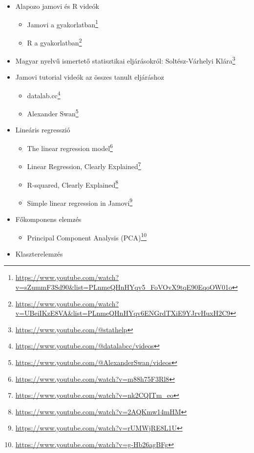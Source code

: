 \documentclass[
  letterpaper,
]{krantz}
\providecommand{\tightlist}{%
  \setlength{\itemsep}{0pt}\setlength{\parskip}{0pt}}\usepackage{longtable,booktabs,array}
\renewcommand{\href}[2]{#2\footnote{\url{#1}}}
\begin{document}
\begin{itemize}
\item
  Alapozo jamovi és R videók

  \begin{itemize}
  \tightlist
  \item
    \href{https://www.youtube.com/watch?v=sZummF3Sd90\&list=PLnmeQHnHYqv5_FoVOvX9tqE90EqoOW01o}{Jamovi
    a gyakorlatban}
  \item
    \href{https://www.youtube.com/watch?v=UBeiIKzE8VA\&list=PLnmeQHnHYqv6ENGrdTXiE9YJrvHuxH2C9}{R
    a gyakorlatban}
  \end{itemize}
\item
  Magyar nyelvű ismertető statisztikai eljárásokról:
  \href{https://www.youtube.com/@stathelp}{Soltész-Várhelyi Klára}
\item
  Jamovi tutorial videók az összes tanult eljáráshoz

  \begin{itemize}
  \tightlist
  \item
    \href{https://www.youtube.com/@datalabcc/videos}{datalab.cc}
  \item
    \href{https://www.youtube.com/@AlexanderSwan/videos}{Alexander Swan}
  \end{itemize}
\item
  Lineáris regresszió

  \begin{itemize}
  \tightlist
  \item
    \href{https://www.youtube.com/watch?v=m88h75F3Rl8}{The linear
    regression model}
  \item
    \href{https://www.youtube.com/watch?v=nk2CQITm_eo}{Linear
    Regression, Clearly Explained}
  \item
    \href{https://www.youtube.com/watch?v=2AQKmw14mHM}{R-squared,
    Clearly Explained}
  \item
    \href{https://www.youtube.com/watch?v=rUMWjRE8L1U}{Simple linear
    regression in Jamovi}
  \end{itemize}
\item
  Főkomponens elemzés

  \begin{itemize}
  \tightlist
  \item
    \href{https://www.youtube.com/watch?v=g-Hb26agBFg}{Principal
    Component Analysis (PCA)}
  \end{itemize}
\item
  Klaszterelemzés


\end{itemize}
\end{document}
